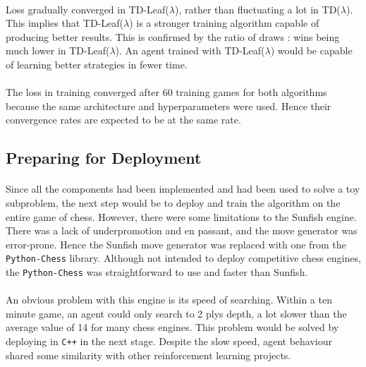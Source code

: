 \documentclass[12pt,a4paper]{book}
\begin{document}
\paragraph{} Loss gradually converged in TD-Leaf($\lambda$), rather than fluctuating a lot in TD($\lambda$). This implies that TD-Leaf($\lambda$) is a stronger training algorithm capable of producing better results. This is confirmed by the ratio of draws : wins being much lower in TD-Leaf($\lambda$). An agent trained with TD-Leaf($\lambda$) would be capable of learning better strategies in fewer time.

\paragraph{} The loss in training converged after 60 training games for both algorithms because the same architecture and hyperparameters were used. Hence their convergence rates are expected to be at the same rate.

\subsection{Preparing for Deployment}

\paragraph{} Since all the components had been implemented and had been used to solve a toy subproblem, the next step would be to deploy and train the algorithm on the entire game of chess. However, there were some limitations to the Sunfish engine. There was a lack of underpromotion and en passant, and the move generator was error-prone. Hence the Sunfish move generator was replaced with one from the \texttt{Python-Chess} library. Although not intended to deploy competitive chess engines, the \texttt{Python-Chess} was straightforward to use and faster than Sunfish.

\paragraph{} An obvious problem with this engine is its speed of searching. Within a ten minute game, an agent could only search to 2 plys depth, a lot slower than the average value of 14 for many chess engines. This problem would be solved by deploying in \texttt{C++} in the next stage. Despite the slow speed, agent behaviour shared some similarity with other reinforcement learning projects.
\end{document}
